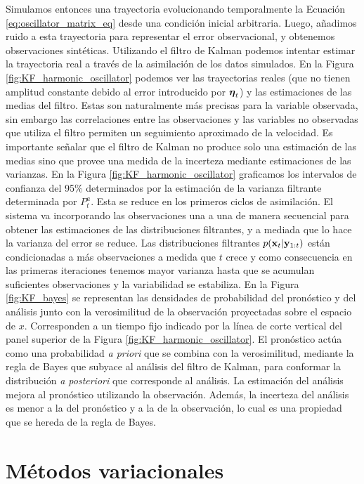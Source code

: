 Simulamos entonces una trayectoria evolucionando temporalmente la Ecuación \ref{eq:oscillator_matrix_eq} desde una condición inicial arbitraria. Luego, añadimos ruido a esta trayectoria para representar el error observacional, y obtenemos observaciones sintéticas. Utilizando el filtro de Kalman podemos intentar estimar la trayectoria real a través de la asimilación de los datos simulados. En la Figura \ref{fig:KF_harmonic_oscillator} podemos ver las trayectorias reales (que no tienen amplitud constante debido al error introducido por $\mbox{\boldmath$ \eta $}_t$) y las estimaciones de las medias del filtro. Estas son naturalmente más precisas para la variable observada, sin embargo las correlaciones entre las observaciones y las variables no observadas que utiliza el filtro permiten un seguimiento aproximado de la velocidad. Es importante señalar que el filtro de Kalman no produce solo una estimación de las medias sino que provee una medida de la incerteza mediante estimaciones de las varianzas. En la Figura \ref{fig:KF_harmonic_oscillator} graficamos los intervalos de confianza del 95\% determinados por la estimación de la varianza filtrante determinada por $P_t^a$. Esta se reduce en los primeros ciclos de asimilación. El sistema va incorporando las observaciones una a una de manera secuencial para obtener las estimaciones de las distribuciones filtrantes, y a mediada que lo hace la varianza del error se reduce. Las distribuciones filtrantes $p(\mathbf{x}_t | \mathbf{y}_{1:t})$ están condicionadas a más observaciones a medida que $t$ crece y como consecuencia en las primeras iteraciones tenemos mayor varianza hasta que se acumulan suficientes observaciones y la variabilidad se estabiliza. En la Figura \ref{fig:KF_bayes} se representan las densidades de probabilidad del pronóstico y del análisis junto con la verosimilitud de la observación proyectadas sobre el espacio de $x$. Corresponden a un tiempo fijo indicado por la línea de corte vertical del panel superior de la Figura \ref{fig:KF_harmonic_oscillator}. El pronóstico actúa como una probabilidad \textit{a priori} que se combina con la verosimilitud, mediante la regla de Bayes que subyace al análisis del filtro de Kalman, para conformar la distribución \textit{a posteriori} que corresponde al análisis. La estimación del análisis mejora al pronóstico utilizando la observación. Además, la incerteza del análisis es menor a la del pronóstico y a la de la observación, lo cual es una propiedad que se hereda de la regla de Bayes. 

\section{Métodos variacionales}

